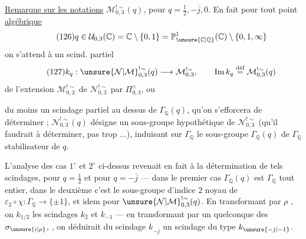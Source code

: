 \uline{Remarque sur les notations} $\mathcal M_{0,3}^{!\sim}(q)$,
pour $q=\frac12,-\overline j,0$.
En fait pour tout point \uline{algébrique}
\[
\tag{126}
q\in\mathcal U_{0,3}(\mathbb C)
=\mathbb C\setminus\{0,1\}
=\mathbb P^1_{\unsure{\mathbb C|\mathbb Q}}(\mathbb C)
\setminus\{0,1,\infty\}
\]
on s'attend à  un scind. partiel
\[
\tag{127}
k_q:\unsure{\mathcal N|\mathcal M}_{0,3}^{!\sim}(q)\longrightarrow\mathcal M_{0,3}^{!\sim},
\qquad\operatorname{Im}k_q\overset{\text{déf}}=\mathcal M_{0,3}^{!\sim}(q)
\]
de l'extension $\mathcal M_{0,3}^{!\sim}$ de
$\mathcal N_{0,3}^{!\sim}$ par $\Pi_{0,3}^{\wedge}$, ou



du moins  un scindage partiel au dessus
de $\Gamma_{\mathbb Q}(q)$, qu'on s'efforcera de déterminer ;
$\mathcal N_{0,3}^{!\sim}(q)$ désigne un sous-groupe
hypothétique de $\mathcal N_{0,3}^{!\sim}$
(qu'il faudrait  à déterminer, 
 pas trop ...), induisant sur $\Gamma_{\mathbb Q}$
le sous-groupe  $\Gamma_{\mathbb Q}(q)$ de
$\Gamma_{\mathbb Q}$ stabilisateur de $q$.


L'analyse des cas $1^\circ$ et $2^\circ$ ci-dessus revenait en fait à
la détermination de tels scindages, pour $q=\frac12$ et pour
$q=-\overline j$ --- dans le premier cas $\Gamma_{\mathbb Q}(q)$ est
$\Gamma_{\mathbb Q}$ tout entier, dans le deuxième c'est le sous-groupe
d'indice $2$ noyau de $\varepsilon_2\circ\chi:\Gamma_{\mathbb Q}
\longrightarrow\{\pm1\}$, et idem pour
$\unsure{\mathcal N|\mathcal M}_{0,3}^{!\sim}(q)$.
En transformant par $\rho$ , on
  $k_{1/2}$
les scindages $k_2$ et $k_{-1}$ --- en transformant par un quelconque
des $\sigma_{\unsure{i|\rho}}$,
, on déduirait
du scindage $k_{-\overline j}$ un scindage du type $k_{\unsure{-j|-1}}$.

